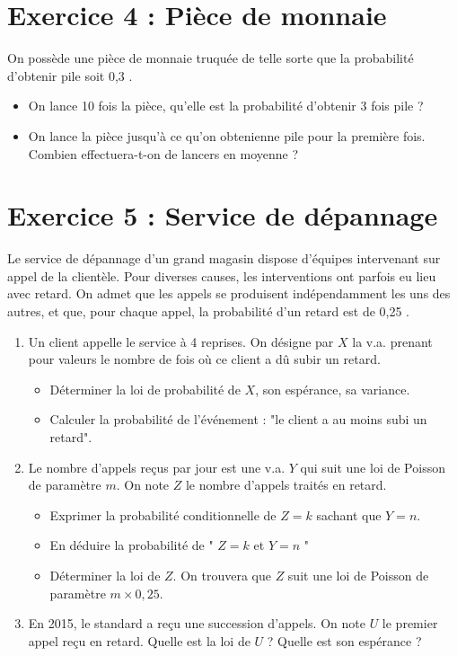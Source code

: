 \section*{Exercice 4 : Pièce de monnaie}

On possède une pièce de monnaie truquée de telle sorte que la probabilité d'obtenir pile soit 0,3 .

\begin{itemize}
    \item On lance 10 fois la pièce, qu'elle est la probabilité d'obtenir 3 fois pile ?
    \item On lance la pièce jusqu'à ce qu'on obtenienne pile pour la première fois. Combien effectuera-t-on de lancers en moyenne ?
\end{itemize}


\section*{Exercice 5 : Service de dépannage}

Le service de dépannage d'un grand magasin dispose d'équipes intervenant sur appel de la clientèle. Pour diverses causes, les interventions ont parfois eu lieu avec retard. On admet que les appels se produisent indépendamment les uns des autres, et que, pour chaque appel, la probabilité d'un retard est de 0,25 .

\begin{enumerate}
    \item Un client appelle le service à 4 reprises. On désigne par \(X\) la v.a. prenant pour valeurs le nombre de fois où ce client a dû subir un retard.
    \begin{itemize}
        \item Déterminer la loi de probabilité de \(X\), son espérance, sa variance.
        \item Calculer la probabilité de l'événement : "le client a au moins subi un retard".
    \end{itemize}
    \item Le nombre d'appels reçus par jour est une v.a. \(Y\) qui suit une loi de Poisson de paramètre \(m\). On note \(Z\) le nombre d'appels traités en retard.
    \begin{itemize}
        \item Exprimer la probabilité conditionnelle de \(Z=k\) sachant que \(Y=n\).
        \item En déduire la probabilité de " \(Z=k\) et \(Y=n\) "
        \item Déterminer la loi de \(Z\). On trouvera que \(Z\) suit une loi de Poisson de paramètre \(m \times 0,25\).
    \end{itemize}
    \item En 2015, le standard a reçu une succession d'appels. On note \(U\) le premier appel reçu en retard. Quelle est la loi de \(U\) ? Quelle est son espérance ?
\end{enumerate}

